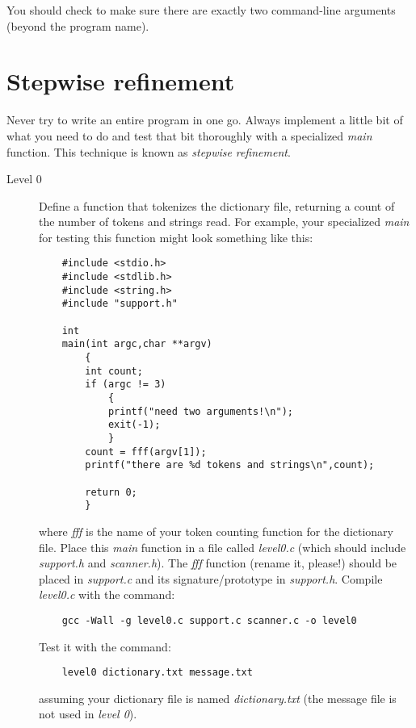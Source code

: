 \documentclass[12pt]{article}
\begin{document}
You should check to make sure there are exactly two command-line
arguments (beyond the program name).

\section*{Stepwise refinement}

Never try to write an entire program in one go. Always implement
a little bit of what you need to do and test that bit thoroughly
with a specialized {\it main} function. This technique is known
as {\it stepwise} {\it refinement}.

\begin{description}
\item[Level 0]
Define a function that tokenizes the dictionary file, returning a count of
the number of tokens and strings read.
For example, your specialized {\it main} for testing
this function might look something like this:

\begin{verbatim}
    #include <stdio.h>
    #include <stdlib.h>
    #include <string.h>
    #include "support.h"

    int
    main(int argc,char **argv)
        {
        int count;
        if (argc != 3)
            {
            printf("need two arguments!\n");
            exit(-1);
            }
        count = fff(argv[1]);
        printf("there are %d tokens and strings\n",count);

        return 0;
        }
\end{verbatim}

where {\it fff} is the name of your token counting function for
the dictionary file.
Place this {\it main} function in a file called {\it level0.c} (which should
include {\it support.h} and {\it scanner.h}).
The {\it fff} function (rename it, please!) should be placed in {\it support.c}
and its signature/prototype
in {\it support.h}.
Compile {\it level0.c} with the command:

\begin{verbatim}
    gcc -Wall -g level0.c support.c scanner.c -o level0
\end{verbatim}

Test it with the command:

\begin{verbatim}
    level0 dictionary.txt message.txt
\end{verbatim}

assuming your dictionary file is named {\it dictionary.txt} (the message file
is not used in {\it level 0}).


\end{description}
\end{document}
